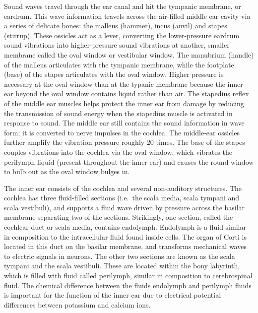 Sound waves travel through the ear canal and hit the tympanic membrane, or eardrum. This wave information travels across the air-filled middle ear cavity via a series of delicate bones: the malleus (hammer), incus (anvil) and stapes (stirrup). These ossicles act as a lever, converting the lower-pressure eardrum sound vibrations into higher-pressure sound vibrations at another, smaller membrane called the oval window or vestibular window. The manubrium (handle) of the malleus articulates with the tympanic membrane, while the footplate (base) of the stapes articulates with the oval window. Higher pressure is necessary at the oval window than at the typanic membrane because the inner ear beyond the oval window contains liquid rather than air. The stapedius reflex of the middle ear muscles helps protect the inner ear from damage by reducing the transmission of sound energy when the stapedius muscle is activated in response to sound. The middle ear still contains the sound information in wave form; it is converted to nerve impulses in the cochlea.
The middle-ear ossicles further amplify the vibration pressure roughly 20 times. The base of the stapes couples vibrations into the cochlea via the oval window, which vibrates the perilymph liquid (present throughout the inner ear) and causes the round window to bulb out as the oval window bulges in.

The inner ear consists of the cochlea and several non-auditory structures. The cochlea has three fluid-filled sections (i.e.~the scala media, scala tympani and scala vestibuli), and supports a fluid wave driven by pressure across the basilar membrane separating two of the sections. Strikingly, one section, called the cochlear duct or scala media, contains endolymph. Endolymph is a fluid similar in composition to the intracellular fluid found inside cells. The organ of Corti is located in this duct on the basilar membrane, and transforms mechanical waves to electric signals in neurons. The other two sections are known as the scala tympani and the scala vestibuli. These are located within the bony labyrinth, which is filled with fluid called perilymph, similar in composition to cerebrospinal fluid. The chemical difference between the fluids endolymph and perilymph fluids is important for the function of the inner ear due to electrical potential differences between potassium and calcium ions.

